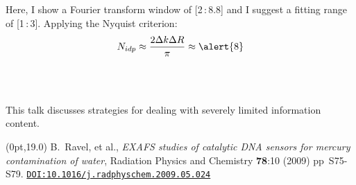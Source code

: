 \documentclass[10pt, xcolor=x11names, compress]{beamer}
\begin{document}
\begin{frame}
\begin{columns}
\begin{column}{0.5\linewidth}
\begin{center}
      \end{center}
    \end{column}
  \end{columns}
  Here, I show a Fourier transform window of [2\,:\,8.8] and I suggest a
  fitting range of [1\,:\,3].  Applying the Nyquist criterion:
  \begin{equation}
    \notag N_{idp} \approx \frac{2\Delta k\Delta R}{\pi} \approx \alert{8}
  \end{equation}

  ~\\[-7ex]
  ~

  \begin{exampleblock}{}
    \begin{center}
      This talk discusses strategies for dealing with severely limited
      information content.
    \end{center}
  \end{exampleblock}

  \begin{textblock*}{0.7\linewidth}(0pt,19.0\TPVertModule)%
    \tiny%
    B.\ Ravel, et al., \textit{EXAFS studies of catalytic DNA sensors
      for mercury contamination of water}, Radiation Physics and
    Chemistry \textbf{78}:10 (2009) pp\ S75-S79.
    \href{http://dx.doi.org/10.1016/j.radphyschem.2009.05.024}
    {\color{Blue4}\texttt{DOI:10.1016/j.radphyschem.2009.05.024}}
  \end{textblock*}
\end{frame}
\end{document}
